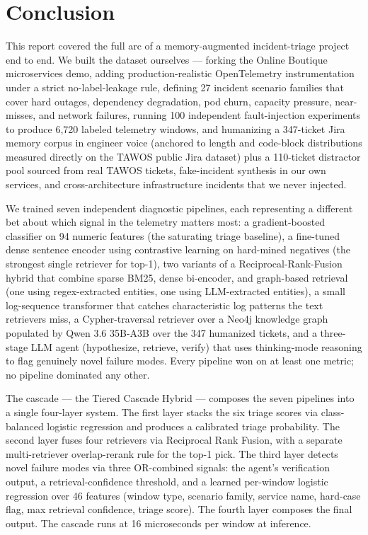\section{Conclusion}
\label{sec:conclusion}

This report covered the full arc of a memory-augmented incident-triage project end to end. We built the dataset ourselves --- forking the Online Boutique microservices demo, adding production-realistic OpenTelemetry instrumentation under a strict no-label-leakage rule, defining 27 incident scenario families that cover hard outages, dependency degradation, pod churn, capacity pressure, near-misses, and network failures, running 100 independent fault-injection experiments to produce 6{,}720 labeled telemetry windows, and humanizing a 347-ticket Jira memory corpus in engineer voice (anchored to length and code-block distributions measured directly on the TAWOS public Jira dataset) plus a 110-ticket distractor pool sourced from real TAWOS tickets, fake-incident synthesis in our own services, and cross-architecture infrastructure incidents that we never injected.

We trained seven independent diagnostic pipelines, each representing a different bet about which signal in the telemetry matters most: a gradient-boosted classifier on 94 numeric features (the saturating triage baseline), a fine-tuned dense sentence encoder using contrastive learning on hard-mined negatives (the strongest single retriever for top-1), two variants of a Reciprocal-Rank-Fusion hybrid that combine sparse BM25, dense bi-encoder, and graph-based retrieval (one using regex-extracted entities, one using LLM-extracted entities), a small log-sequence transformer that catches characteristic log patterns the text retrievers miss, a Cypher-traversal retriever over a Neo4j knowledge graph populated by Qwen 3.6 35B-A3B over the 347 humanized tickets, and a three-stage LLM agent (hypothesize, retrieve, verify) that uses thinking-mode reasoning to flag genuinely novel failure modes. Every pipeline won on at least one metric; no pipeline dominated any other.

The cascade --- the Tiered Cascade Hybrid --- composes the seven pipelines into a single four-layer system. The first layer stacks the six triage scores via class-balanced logistic regression and produces a calibrated triage probability. The second layer fuses four retrievers via Reciprocal Rank Fusion, with a separate multi-retriever overlap-rerank rule for the top-1 pick. The third layer detects novel failure modes via three OR-combined signals: the agent's verification output, a retrieval-confidence threshold, and a learned per-window logistic regression over 46 features (window type, scenario family, service name, hard-case flag, max retrieval confidence, triage score). The fourth layer composes the final output. The cascade runs at 16 microseconds per window at inference.


